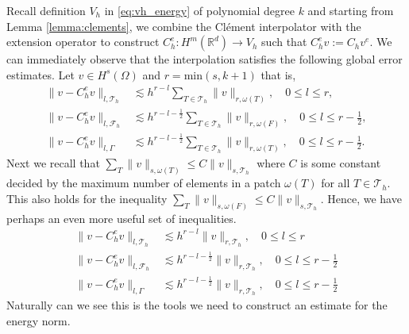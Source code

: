 Recall definition $V_{h}$ in \eqref{eq:vh_energy} of polynomial degree $k$ and starting from Lemma \ref{lemma:clements}, we combine the Clément interpolator with the extension operator to construct $C_{h}^{e}: H^{m}( \mathbb{R} ^{d}) \to V_{h}$ such that $C ^{e} _{h} v := C _{h} v^{e} $.
We can immediately observe that the interpolation satisfies the following global error estimates. Let $v \in H^{s}( \Omega ) $ and $r = \mathrm{min}(s , k+1) $  that is,
\begin{align}
    \| v - C _{h}^{e} v \|_{  l, \mathcal{T} _{h} }^{  } & \lesssim h^{r-l}\sum_{T \in \mathcal{T}_h} \| v \|_{ r, \omega(T) }^{  }, \quad 0\le l\le r, \\
    \| v - C ^{e}_{h}v \|_{ l,\mathcal{F} _{h} }^{  } & \lesssim h^{r-l-\frac{1}{2}}\sum_{T \in \mathcal{T}_h} \| v \|_{ r, \omega(F)  }^{  }, \quad 0  \le  l \le   r-\frac{1}{2}, \\
\| v - C ^{e}_{h}v \|_{ l, \Gamma }^{  } & \lesssim h^{r-l-\frac{1}{2}} \sum_{T \in \mathcal{T}_h}  \| v \|_{ r,  \omega(T)  }^{  }, \quad 0  \le  l \le  r-\frac{1}{2}.
\end{align}
 Next we recall that $ \sum_{T}^{} \| v \|_{s,\omega ( T)   }^{  } \le C  \| v \|_{s, \mathcal{T}_{h}   }^{  } $ where $C$ is some constant decided by the maximum number of elements in a patch
    $\omega( T)  $ for all $T \in \mathcal{T} _{h}$. This also holds for the inequality $ \sum_{T}^{} \| v \|_{s,\omega ( F)   }^{  } \le C  \| v \|_{s, \mathcal{T}_{h}   }^{  } $. Hence, we have perhaps an even more useful set of inequalities.
\begin{align}
    \label{eq:bi_projection_estimates_1}
    \| v - C _{h}^{e} v \|_{  l, \mathcal{T} _{h} }^{  } & \lesssim h^{r-l} \| v \|_{ r, \mathcal{T} _{h} }^{  }, \quad 0\le l\le r \\
    \label{eq:bi_projection_estimates_2}
    \| v - C ^{e}_{h}v \|_{ l,\mathcal{F} _{h} }^{  } & \lesssim h^{r-l-\frac{1}{2}} \| v \|_{ r, \mathcal{T} _{h}  }^{  }, \quad 0  \le  l \le   r-\frac{1}{2} \\
    \label{eq:bi_projection_estimates_3}
\| v - C ^{e}_{h}v \|_{ l, \Gamma }^{  } & \lesssim h^{r-l-\frac{1}{2}}   \| v \|_{ r,  \mathcal{T} _{h}  }^{  }, \quad 0  \le  l \le  r-\frac{1}{2}
\end{align}
Naturally can we see this is the tools we need to construct an estimate for the energy norm.

